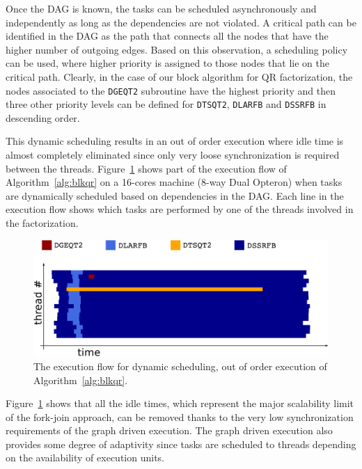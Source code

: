 \documentclass[runningheads]{llncs}
\begin{document}
Once the DAG is known, the tasks can be scheduled asynchronously and
independently as long as the dependencies are not violated. A critical
path can be identified in the DAG as the path that connects all the
nodes that have the higher number of outgoing edges. Based on this
observation, a scheduling policy can be used, where higher priority is
assigned to those nodes that lie on the critical path. Clearly, in the
case of our block algorithm for QR factorization, the nodes associated to the
\texttt{DGEQT2} subroutine have the highest priority and then three other
priority levels can be defined for \texttt{DTSQT2}, \texttt{DLARFB} and
\texttt{DSSRFB} in descending order.

This
dynamic scheduling results in an out of order execution where idle
time is almost completely eliminated since only very loose
synchronization is required between the threads. Figure~\ref{fig:flow}
shows part of the execution flow of Algorithm~\ref{alg:blkqr} on a
16-cores machine (8-way Dual Opteron) when tasks are dynamically
scheduled based on dependencies in the DAG. Each line in the execution
flow shows which tasks are performed by one of the threads involved in the
factorization.

\begin{figure}[!h]
  \begin{center}
    \includegraphics[width=\textwidth]{images/qr_flow_neumann_color.pdf}
  \caption{\label{fig:flow}The execution flow for dynamic scheduling,
    out of order execution of Algorithm~\ref{alg:blkqr}.}
  \end{center}
\end{figure}

Figure~\ref{fig:flow} shows that all the idle times, which represent
the major scalability limit of the fork-join approach, can be
 removed thanks to the very low synchronization requirements
of the graph driven execution. The graph driven execution also
provides some degree of adaptivity since tasks are scheduled to
threads depending on the availability of execution units.
\end{document}
